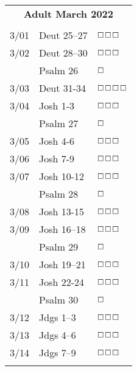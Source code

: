 \documentclass[10pt,landscape,letterpaper]{article}
\begin{document}

\begin{multicols}{5}
\small

\begin{tabular}{p{0.15in}p{0.7in}p{0.5in}}
\multicolumn{3}{c}{\textbf{Adult March 2022}} \\
& & \\
3/01 & Deut 25--27 & $\boxempty$$\boxempty$$\boxempty$ \\
3/02 & Deut 28--30 & $\boxempty$$\boxempty$$\boxempty$ \\
 & \textcolor[rgb]{0.98,0.00,0.00}{Psalm 26} & \textcolor[rgb]{1.00,0.00,0.00}{$\boxempty$} \\
3/03 & Deut 31-34 & $\boxempty$$\boxempty$$\boxempty$$\boxempty$ \\
3/04 & Josh 1-3 & $\boxempty$$\boxempty$$\boxempty$ \\
 & \textcolor[rgb]{0.98,0.00,0.00}{Psalm 27} & \textcolor[rgb]{1.00,0.00,0.00}{$\boxempty$} \\
3/05 & Josh 4-6 & $\boxempty$$\boxempty$$\boxempty$ \\
3/06 & Josh 7-9 & $\boxempty$$\boxempty$$\boxempty$ \\
3/07 & Josh 10-12 & $\boxempty$$\boxempty$$\boxempty$ \\
 & \textcolor[rgb]{0.98,0.00,0.00}{Psalm 28} & \textcolor[rgb]{1.00,0.00,0.00}{$\boxempty$} \\
3/08 & Josh 13-15 & $\boxempty$$\boxempty$$\boxempty$ \\
3/09 & Josh 16--18 & $\boxempty$$\boxempty$$\boxempty$ \\
 & \textcolor[rgb]{0.98,0.00,0.00}{Psalm 29} & \textcolor[rgb]{1.00,0.00,0.00}{$\boxempty$} \\
3/10 & Josh 19--21 & $\boxempty$$\boxempty$$\boxempty$ \\
3/11 & Josh 22-24 & $\boxempty$$\boxempty$$\boxempty$ \\
 & \textcolor[rgb]{0.98,0.00,0.00}{Psalm 30} & \textcolor[rgb]{1.00,0.00,0.00}{$\boxempty$} \\
3/12 & Jdgs 1--3 & $\boxempty$$\boxempty$$\boxempty$ \\
3/13 & Jdgs 4--6 & $\boxempty$$\boxempty$$\boxempty$ \\
3/14 & Jdgs 7--9 & $\boxempty$$\boxempty$$\boxempty$ \\
$$
\end{tabular}
\end{multicols}
\end{document}
